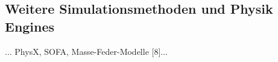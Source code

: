 \subsection{Weitere Simulationsmethoden und Physik Engines}
... PhysX, SOFA, Masse-Feder-Modelle [8]...

%
%
%

%




